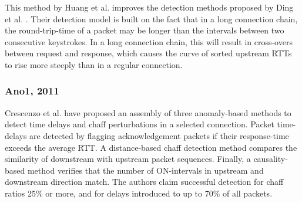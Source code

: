 \documentclass[runningheads,11pt]{llncs}\usepackage[]{graphicx}\usepackage[]{color}
\begin{document}
This method by Huang et al. \cite{huang2016detecting} improves the detection methods proposed by Ding et al. \cite{ding2009detecting}. %
Their detection model is built on the fact that in a long connection chain, the round-trip-time of a packet may be longer than the intervals between two consecutive keystrokes. %
In a long connection chain, this will result in cross-overs between request and response, which causes the curve of sorted upstream RTTs to rise more steeply than in a regular connection. %







\subsubsection{Ano1, 2011}

Crescenzo et al. \cite{di2011detecting} have proposed an assembly of three anomaly-based methods to detect time delays and chaff perturbations in a selected connection. 
Packet time-delays are detected by flagging acknowledgement packets if their response-time exceeds the average RTT. A distance-based chaff detection method compares the similarity of downstream with upstream packet sequences. Finally, a causality-based method verifies that the number of ON-intervals in upstream and downstream direction match.
The authors claim successful detection for chaff ratios 25\% or more, and for delays introduced to up to 70\% of all packets.

\end{document}
